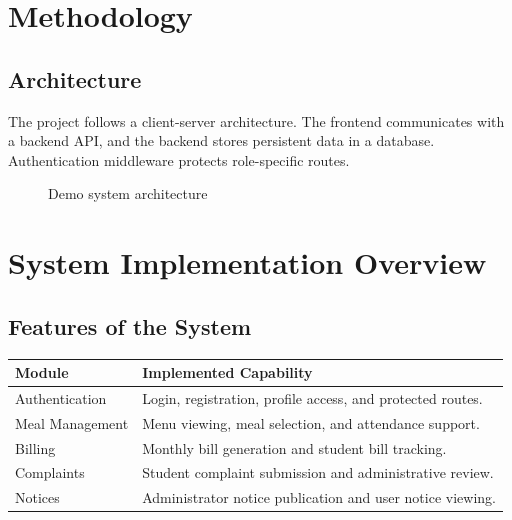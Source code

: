 \documentclass[12pt,a4paper]{report}
\begin{document}
\chapter{Methodology}
\section{Architecture}
The project follows a client-server architecture. The frontend communicates with a backend API, and the backend stores persistent data in a database. Authentication middleware protects role-specific routes.

\begin{figure}[H]
\centering
{}
\caption{Demo system architecture}
\end{figure}

\chapter{System Implementation Overview}
\section{Features of the System}
\begin{longtable}{p{4cm}p{10cm}}
\toprule
\textbf{Module} & \textbf{Implemented Capability} \\
\midrule
Authentication & Login, registration, profile access, and protected routes. \\
Meal Management & Menu viewing, meal selection, and attendance support. \\
Billing & Monthly bill generation and student bill tracking. \\
Complaints & Student complaint submission and administrative review. \\
Notices & Administrator notice publication and user notice viewing. \\
\bottomrule
\end{longtable}
\end{document}
